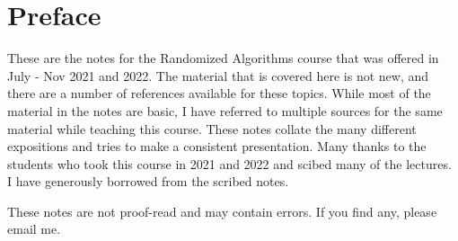 \chapter*{Preface}

These are the notes for the Randomized Algorithms course that was offered in
July - Nov 2021 and 2022. The material that is covered here is not new, and
there are a number of references available for these topics. While most of the material in the notes are basic, I have referred to multiple sources for the same material while teaching this course. These notes collate the many different
expositions and tries to make a consistent presentation. Many thanks to the
students who took this course in 2021 and 2022 and scibed many of the
lectures. I have generously borrowed from the scribed notes.

These notes are not proof-read and may contain errors. If you find any, please
email me.

